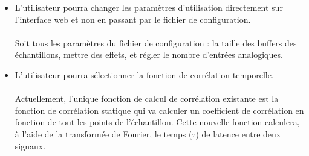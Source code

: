 \documentclass{article}
\begin{document}
\begin{itemize}
	\item L'utilisateur pourra changer les paramètres d'utilisation directement sur
	      l'interface web et non en passant par le fichier de configuration.
	      \paragraph{}
	      Soit tous les paramètres du fichier de configuration : la taille des buffers
	      des échantillons, mettre des effets, et régler le nombre d'entrées analogiques.

	\item L'utilisateur pourra sélectionner la fonction de corrélation temporelle.
	      \paragraph{}
	      Actuellement, l'unique fonction de calcul de corrélation existante est
	      la fonction de corrélation statique qui va calculer un coefficient de corrélation
	      en fonction de tout les points de l’échantillon. Cette nouvelle fonction
	      calculera, à l'aide de la transformée de Fourier, le temps ($\tau$) de latence
	      entre deux signaux.


\end{itemize}
\end{document}
